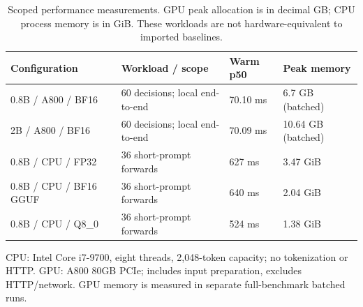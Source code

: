 \begin{table}[t]
\centering
\footnotesize
\setlength{\tabcolsep}{4pt}
\caption{Scoped performance measurements. GPU peak allocation is in decimal GB; CPU process memory is in GiB. These workloads are not hardware-equivalent to imported baselines.}
\label{tab:efficiency}
\begin{tabular}{llll}
\toprule
Configuration & Workload / scope & Warm p50 & Peak memory \\
\midrule
0.8B / A800 / BF16 & 60 decisions; local end-to-end & 70.10 ms & 6.7 GB (batched) \\
2B / A800 / BF16 & 60 decisions; local end-to-end & 70.09 ms & 10.64 GB (batched) \\
0.8B / CPU / FP32 & 36 short-prompt forwards & 627 ms & 3.47 GiB \\
0.8B / CPU / BF16 GGUF & 36 short-prompt forwards & 640 ms & 2.04 GiB \\
0.8B / CPU / Q8\_0 & 36 short-prompt forwards & 524 ms & 1.38 GiB \\
\bottomrule
\end{tabular}
\par\vspace{3pt}\begin{minipage}{\textwidth}\footnotesize CPU: Intel Core i7-9700, eight threads, 2,048-token capacity; no tokenization or HTTP. GPU: A800 80GB PCIe; includes input preparation, excludes HTTP/network. GPU memory is measured in separate full-benchmark batched runs.\end{minipage}
\end{table}
